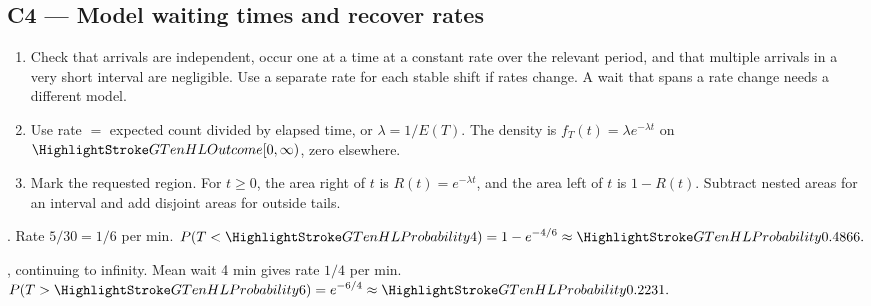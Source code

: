 \clearpage
\subsection{C4 --- Model waiting times and recover rates}\label{crit:c4}
\begin{enumerate}
  \item Check that arrivals are independent, occur one at a time at a constant rate over the relevant period, and that multiple arrivals in a very short interval are negligible. Use a separate rate for each stable shift if rates change. A wait that spans a rate change needs a different model.
  \item Use rate \(=\) expected count divided by elapsed time, or \(\lambda=1/E(T)\).  The density is \(f_T(t)=\lambda e^{-\lambda t}\) on \(\OutlineModel{[0,\infty)}\), zero elsewhere.
  \item Mark the requested region. For \(t\ge0\), the area right of \(t\) is \(R(t)=e^{-\lambda t}\), and the area left of \(t\) is \(1-R(t)\). Subtract nested areas for an interval and add disjoint areas for outside tails.
\end{enumerate}

\noindent
\begin{minipage}[t]{0.49\linewidth}
  {. Rate \(5/30=1/6\) per min.}
\(\displaystyle P(T<\OutlineEvent{4})=1-e^{-4/6}\approx\OutlineEvent{0.4866}.\)
\end{minipage}\hfill
\begin{minipage}[t]{0.49\linewidth}
  {, continuing to infinity. Mean wait 4 min gives rate \(1/4\) per min.}
\(\displaystyle P(T>\OutlineEvent{6})=e^{-6/4}\approx\OutlineEvent{0.2231}.\)
\end{minipage}

